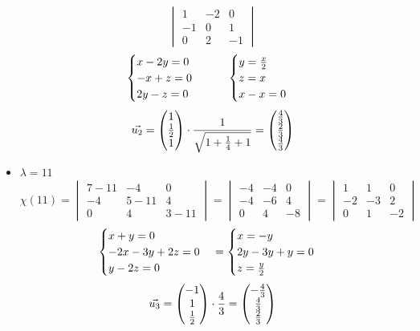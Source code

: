 \begin{itemize}
$$    \begin{vmatrix}
    	1 & -2 & 0 \\
        -1 & 0 & 1 \\
        0 & 2 & -1
    \end{vmatrix} $$
    $$
    \begin{cases}
    	x - 2y = 0 \\
        -x + z = 0 \\
        2y - z = 0
    \end{cases} \qquad
    \begin{cases}
    	y = \half[x] \\
        z = x \\
        x - x = 0
    \end{cases} $$
    $$ \vec{u_2} =
    \begin{pmatrix}
    	1 \\
        \half \\
        1
    \end{pmatrix} \cdot \frac1{\sqrt{1 + \frac14 + 1}} =
    \begin{pmatrix}
    	\frac43 \\
        \frac23 \\
        \frac43
    \end{pmatrix} $$
    \item $ \lambda = 11 $
    $$ \chi(11) =
    \begin{vmatrix}
    	7 - 11 & -4 & 0 \\
        -4 & 5 - 11 & 4 \\
        0 & 4 & 3 - 11
    \end{vmatrix} =
    \begin{vmatrix}
    	-4 & -4 & 0 \\
        -4 & -6 & 4 \\
        0 & 4 & -8
    \end{vmatrix} =
    \begin{vmatrix}
    	1 & 1 & 0 \\
        -2 & -3 & 2 \\
        0 & 1 & -2
    \end{vmatrix} $$
    $$
    \begin{cases}
    	x + y = 0 \\
        -2x - 3y + 2z = 0 \\
        y - 2z = 0
    \end{cases} =
    \begin{cases}
    	x = -y \\
        2y - 3y + y = 0 \\
        z = \half[y]
    \end{cases} $$
    $$ \vec{u_3} =
    \begin{pmatrix}
    	-1 \\
        1 \\
        \half
    \end{pmatrix} \cdot \frac43 =
    \begin{pmatrix}
    	-\frac43 \\
        \frac43 \\
        \frac23
    \end{pmatrix} $$
\end{itemize}
